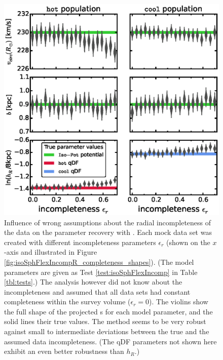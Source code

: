 
\begin{figure}[!htbp]
\centering
\includegraphics[width=\columnwidth]{figs/isoSphFlexIncompR_violins_2.eps}
\caption{Influence of wrong assumptions about the radial incompleteness of the data on the parameter recovery with \RM{}. Each mock data set was created with different incompleteness parameters $\epsilon_r$ (shown on the $x$-axis and illustrated in Figure \ref{fig:isoSphFlexIncompR_completeness_shapes}). (The model parameters are given as Test \ref{test:isoSphFlexIncomp} in Table \ref{tbl:tests}.) The analysis however did not know about the incompleteness and assumed that all data sets had constant completeness within the survey volume ($\epsilon_r = 0$). The violins show the full shape of the projected \pdf{}s for each model parameter, and the solid lines their true values. The \RM{} method seems to be very robust against small to intermediate deviations between the true and the assumed data incompleteness. (The qDF parameters not shown here exhibit an even better robustness than $h_R$.) } 
\label{fig:isoSphFlexIncompR_violins}
\end{figure}

